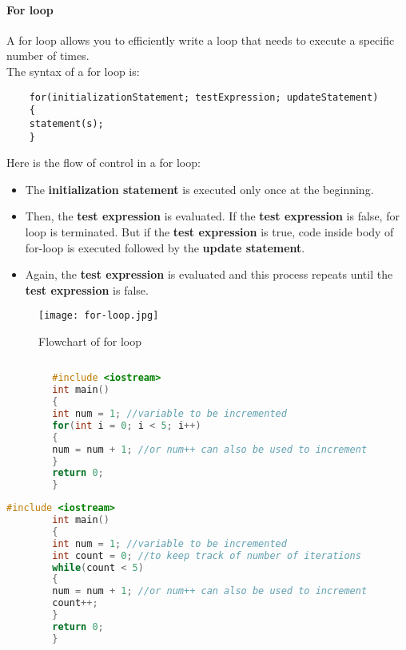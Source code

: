 \documentclass[11pt,fleqn]{book} %
\begin{document}
	\paragraph{For loop}
	A for loop allows you to efficiently write a loop that needs to execute a specific number of times. ~\\
	The syntax of a for loop is:
	\begin{lstlisting}
	for(initializationStatement; testExpression; updateStatement) 
	{
	statement(s); 
	}
	\end{lstlisting}
	Here is the flow of control in a for loop:
	\begin{itemize}
		\item The \textbf{initialization statement} is executed only once at the beginning.
		\item Then, the \textbf{test expression} is evaluated.
		If the \textbf{test expression} is false, for loop is terminated. But if the \textbf{test expression} is true, code inside body of for-loop is executed followed by the \textbf{update statement}.
		\item Again, the \textbf{test expression} is evaluated and this process repeats until the \textbf{test expression} is false.
	\end{itemize}
	\begin{figure}[H]
		\centering
		\texttt{[image: for-loop.jpg]}
		\caption{Flowchart of for loop}
	\end{figure}
	\begin{example}
		\begin{lstlisting}[language=C++, caption = Using For loop to increment an integer 5 times]
		
		#include <iostream>
		int main()
		{
		int num = 1; //variable to be incremented
		for(int i = 0; i < 5; i++)
		{
		num = num + 1; //or num++ can also be used to increment
		}
		return 0;
		}
		\end{lstlisting}
	\end{example}
	
	\begin{example}
		\begin{lstlisting}[language=C++, caption = Using While loop to increment an integer 5 times]
		#include <iostream>
		int main()
		{
		int num = 1; //variable to be incremented
		int count = 0; //to keep track of number of iterations
		while(count < 5)
		{
		num = num + 1; //or num++ can also be used to increment
		count++;
		}
		return 0;
		}
		\end{lstlisting}
	\end{example}
	
\end{document}
